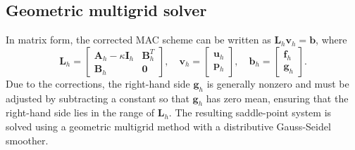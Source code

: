 \documentclass[preprint,11pt]{elsarticle}
\theoremstyle{remark}
\newcommand{\bm}[1]{\boldsymbol{#1}}
\begin{document}
\subsection{Geometric multigrid solver}
In matrix form, the corrected MAC scheme can be written as $\mathbf{L}_h\mathbf{v}_h = \mathbf{b}$, where 
\begin{equation}
    \mathbf{L}_h = 
    \begin{bmatrix}
        \mathbf{A}_h - \kappa\mathbf{I}_h & \mathbf{B}^T_h\\
        \mathbf{B}_h & \mathbf{0}
    \end{bmatrix},\quad 
    \mathbf{v}_h = 
    \begin{bmatrix}
        \mathbf{u}_h\\
        \bm p_h
    \end{bmatrix}, \quad 
    \mathbf{b}_h = 
    \begin{bmatrix}
        \mathbf{f}_h\\
        \bm g_h
    \end{bmatrix}.
\end{equation}
Due to the corrections, the right-hand side $\bm g_h$ is generally nonzero and must be adjusted by subtracting a constant so that $\bm g_h$ has zero mean, ensuring that the right-hand side lies in the range of $\bm L_h$. 
The resulting saddle-point system is solved using a geometric multigrid method with a distributive Gauss-Seidel smoother.
\end{document}
